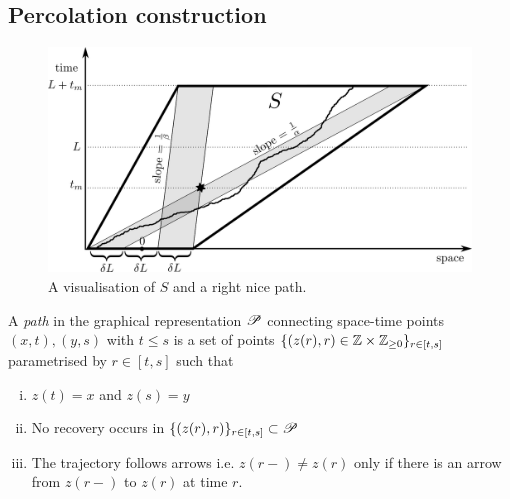 \subsection{Percolation construction}

\begin{figure}[!h]
  \includegraphics[width=\linewidth]{images/construction_single_tile}
  \caption{A visualisation of $S$ and a right nice path. }
  \label{fig:construction_single_tile}
\end{figure}

\begin{definition}
A \textit{path} in the graphical representation $\mathscr{P}$ connecting space-time points $(x, t), (y, s)$ with $t \leq s$ is a set of points $\{(z(r), r) \in \mathbb{Z} \times \mathbb{Z}_{\geq 0} \}_{r \in [t,s]}$ parametrised by $r \in [t, s]$ such that 
\begin{enumerate}[(i)] 
\item $z(t) = x$ and $z(s) = y$
\item No recovery occurs in $\{(z(r), r)\}_{r \in [t,s]} \subset \mathscr{P}$
\item The trajectory follows arrows i.e. $z(r-) \neq z(r)$ only if there is an arrow from $z(r-)$ to $z(r)$ at time $r$.   
\end{enumerate}
\end{definition}

